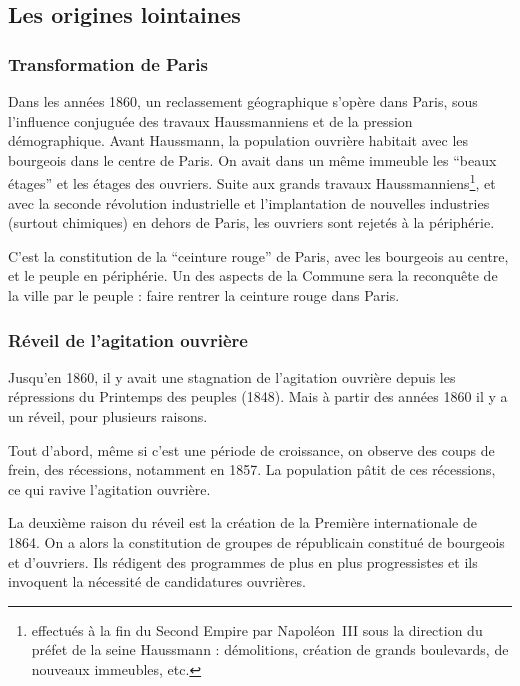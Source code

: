 \documentclass[12pt]{report}
\begin{document}
\subsection{Les origines lointaines}


\subsubsection{Transformation de Paris}

Dans les années 1860, un reclassement géographique s'opère dans Paris, sous l'influence conjuguée des travaux Haussmanniens et de la pression démographique.
Avant Haussmann, la population ouvrière habitait avec les bourgeois dans le centre de Paris.
On avait dans un même immeuble les \enquote{beaux étages} et les étages des ouvriers.
Suite aux grands travaux Haussmanniens\footnote{effectués à la fin du Second Empire par Napoléon~III sous la direction du préfet de la seine Haussmann : démolitions, création de grands boulevards, de nouveaux immeubles, etc.}, et avec la seconde révolution industrielle et l'implantation de nouvelles industries (surtout chimiques) en dehors de Paris, les ouvriers sont rejetés à la périphérie.

C'est la constitution de la \enquote{ceinture rouge} de Paris, avec les bourgeois au centre, et le peuple en périphérie.
Un des aspects de la Commune sera la reconquête de la ville par le peuple : faire rentrer la ceinture rouge dans Paris.

\subsubsection{Réveil de l'agitation ouvrière}


Jusqu’en 1860, il y avait une stagnation de l’agitation ouvrière depuis les répressions du Printemps des peuples (1848).
Mais à partir des années 1860 il y a un réveil, pour plusieurs raisons.

Tout d'abord, même si c'est une période de croissance, on observe des coups de frein, des récessions, notamment en 1857.
La population pâtit de ces récessions, ce qui ravive l'agitation ouvrière.

La deuxième raison du réveil est la création de la Première internationale de 1864.
On a alors la constitution de groupes de républicain constitué de bourgeois et d’ouvriers. 
Ils rédigent des programmes de plus en plus progressistes et ils invoquent la nécessité de candidatures ouvrières.
\end{document}

